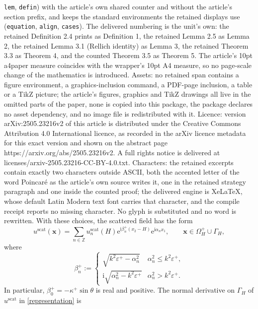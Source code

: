 \documentclass[10pt,a4paper]{amsart}
\newcommand{\bx}{{\mathbf x}}
\newcommand{\ri}{{\mathrm i}}
\newcommand{\re}{{\mathrm e}}
\newcommand{\scat}{{\mathrm{scat}}}
\newcommand{\GH}{{\Gamma_H}}
\begin{document}
\texttt{lem}, \texttt{defin}) with the article's own shared counter and without the article's section prefix, and keeps the standard environments the retained displays use (\texttt{equation}, \texttt{align}, \texttt{cases}). The delivered numbering is the unit's own: the retained Definition 2.4 prints as Definition 1, the retained Lemma 2.5 as Lemma 2, the retained Lemma 3.1 (Rellich identity) as Lemma 3, the retained Theorem 3.3 as Theorem 4, and the counted Theorem 3.5 as Theorem 5. The article's 10pt a4paper measure coincides with the wrapper's 10pt A4 measure, so no page-scale change of the mathematics is introduced. Assets: no retained span contains a figure environment, a graphics-inclusion command, a PDF-page inclusion, a table or a TikZ picture; the article's figures, graphics and TikZ drawings all live in the omitted parts of the paper, none is copied into this package, the package declares no asset dependency, and no image file is redistributed with it. Licence: version arXiv:2505.23216v2 of this article is distributed under the Creative Commons Attribution 4.0 International licence, as recorded in the arXiv licence metadata for this exact version and shown on the abstract page https://arxiv.org/abs/2505.23216v2. A full rights notice is delivered at licenses/arxiv-2505.23216-CC-BY-4.0.txt. Characters: the retained excerpts contain exactly two characters outside ASCII, both the accented letter of the word Poincar\'e as the article's own source writes it, one in the retained strategy paragraph and one inside the counted proof; the delivered engine is XeLaTeX, whose default Latin Modern text font carries that character, and the compile receipt reports no missing character. No glyph is substituted and no word is rewritten.
With these choices, the scattered field has the form
\begin{equation} \label{representation}
u^\scat(\bx)=\sum_{n\in\mathbb{Z}} u^\scat_n(H)\re^{\ri\beta_n^+ (x_2-H)} \re^{\ri\alpha_n x_1},    \qquad \bx\in\Omega_H^+ \cup \GH,
\end{equation}
where
\begin{equation} \label{beta_piu}
\beta_n^+ := \begin{cases} \sqrt{k^2\varepsilon^+-\alpha_n^2} & \alpha_n^2 \leq k^2\varepsilon^+, \\ 
	\ri\sqrt{\alpha_n^2-k^2\varepsilon^+} & \alpha_n^2 > k^2\varepsilon^+. \end{cases} 
	\end{equation}
	In particular, $\beta_0^+=-\kappa^+\sin\theta$ is real and positive.
	The normal derivative on $\GH$ of $u^\scat$ in \eqref{representation} is
\end{document}
